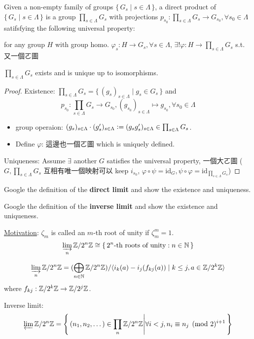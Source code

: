 \begin{definition}
  Given a non-empty family of groups $\{\, G_s \mid s \in \Lambda \,\}$,
  a direct product of $\{\, G_s \mid s \in \Lambda \,\}$ is a group
  $\prod_{s\in \Lambda} G_s$ with projections
  $p_{s_0}: \prod_{s\in \Lambda} G_s \to G_{s_0}, \forall s_0 \in \Lambda$
  satifsfying the following universal property:

  for any group $H$ with group homo.
  $\varphi_s: H \to G_s, \forall s \in \Lambda$, $\exists! \varphi:
  H \to \prod_{s\in \Lambda} G_s$ s.t. 又一個ㄛ圖
\end{definition}

\begin{theorem}
  $\prod_{s\in \Lambda} G_s$ exists and is unique up to isomorphisms.

  \begin{proof}
    Existence: $\prod_{s\in \Lambda} G_s = \{\, (g_s)_{s\in \Lambda}
      \mid g_s \in G_s \,\}$ and
      \[ p_{s_0}: \prod_{s\in \Lambda} G_s \to G_{s_0},
        (g_{s_0})_{s\in \Lambda} \mapsto g_{s_0}, \forall s_0 \in \Lambda \]
      \begin{itemize}
        \item group operaion: $(g_s)_{s \in \Lambda} \cdot (g_s')_{s \in \Lambda}
          \vcentcolon= (g_s g_s')_{s \in \Lambda} \in \prod_{s\in \Lambda} G_s$.
        \item Define $\varphi$:
          這邊也一個ㄛ圖
          which is uniquely defined.
      \end{itemize}

    Uniqueness: Assume $\exists$ another $G$ satisfies the universal property,
    一個大ㄛ圖 ($G, \prod_{s\in \Lambda} G_s$ 互相有唯一個映射可以
    keep $i_{s_0}$, $\varphi \circ \psi = \text{id}_{G}, \psi \circ \varphi
    = \text{id}_{\prod_{s\in \Lambda} G_s}$)
  \end{proof}
\end{theorem}

\begin{exercise}
  Google the definition of the {\bf direct limit} and show the existence and
  uniqueness.
\end{exercise}

\begin{exercise}
  Google the definition of the {\bf inverse limit} and show the existence and
  uniqueness.
\end{exercise}

\underline{Motivation}: $\zeta_m$ is called an $m$-th root of unity if
$\zeta_m^m = 1$.
\[ \varinjlim\limits_n {\mathbb{Z}}/{2^n\mathbb{Z}} \cong
\{\, \text{$2^n$-th roots of unity} : n \in \mathbb{N} \,\} \]


\[ \varinjlim\limits_n {\mathbb{Z}}/{2^n\mathbb{Z}} =
  {(\bigoplus_{n\in\mathbb{N}} {\mathbb{Z}}/{2^n\mathbb{Z}})}/{
  \langle i_k(a) - i_j(f_{kj}(a)) \mid k \le j, a \in {\mathbb{Z}}/{2^k\mathbb{Z}} \rangle}
\]
where $f_{kj}: {\mathbb{Z}}/{2^k\mathbb{Z}} \to {\mathbb{Z}}/{2^j\mathbb{Z}}$.

Inverse limit:
\[
  \varprojlim {\mathbb{Z}}/{2^n\mathbb{Z}} = \left\{\,
    (n_1, n_2, \dots ) \in \prod_n {\mathbb{Z}}/{2^n\mathbb{Z}} \middle|
    \forall i < j, n_i \equiv n_j \pmod 2^{i+1}   \,\right\}
\]
